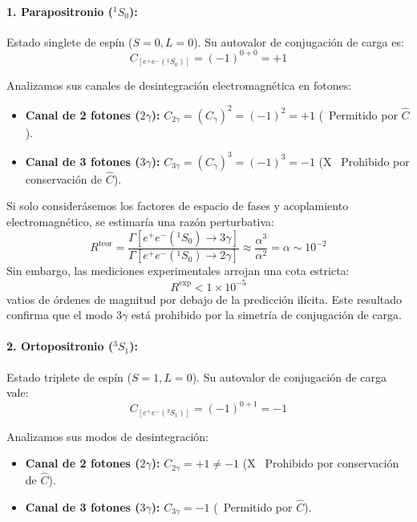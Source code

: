 \paragraph{1. Parapositronio ($^1S_0$):}
Estado singlete de espín ($S = 0, L = 0$). Su autovalor de conjugación de carga es:
\begin{equation}
    C_{[e^+ e^-(^1S_0)]} = (-1)^{0+0} = +1
\end{equation}

Analizamos sus canales de desintegración electromagnética en fotones:
\begin{itemize}
    \item \textbf{Canal de 2 fotones ($2\gamma$):} $C_{2\gamma} = (C_\gamma)^2 = (-1)^2 = +1$ \quad (\checkmark \, Permitido por $\hat{C}$).
    \item \textbf{Canal de 3 fotones ($3\gamma$):} $C_{3\gamma} = (C_\gamma)^3 = (-1)^3 = -1$ \quad (\textsf{X} \, Prohibido por conservación de $\hat{C}$).
\end{itemize}

Si solo considerásemos los factores de espacio de fases y acoplamiento electromagnético, se estimaría una razón perturbativa:
\begin{equation}
    R^{\text{teor}} = \frac{\Gamma[e^+ e^-(^1S_0) \to 3\gamma]}{\Gamma[e^+ e^-(^1S_0) \to 2\gamma]} \approx \frac{\alpha^3}{\alpha^2} = \alpha \sim 10^{-2}
\end{equation}
Sin embargo, las mediciones experimentales arrojan una cota estricta:
\begin{equation}
    R^{\text{exp}} < 1 \times 10^{-5}
\end{equation}
vatios de órdenes de magnitud por debajo de la predicción ilícita. Este resultado confirma que el modo $3\gamma$ está prohibido por la simetría de conjugación de carga.

\paragraph{2. Ortopositronio ($^3S_1$):}
Estado triplete de espín ($S = 1, L = 0$). Su autovalor de conjugación de carga vale:
\begin{equation}
    C_{[e^+ e^-(^3S_1)]} = (-1)^{0+1} = -1
\end{equation}

Analizamos sus modos de desintegración:
\begin{itemize}
    \item \textbf{Canal de 2 fotones ($2\gamma$):} $C_{2\gamma} = +1 \neq -1$ \quad (\textsf{X} \, Prohibido por conservación de $\hat{C}$).
    \item \textbf{Canal de 3 fotones ($3\gamma$):} $C_{3\gamma} = -1$ \quad (\checkmark \, Permitido por $\hat{C}$).
\end{itemize}

